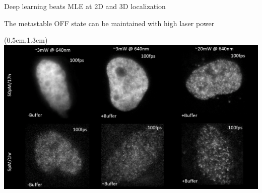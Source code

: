 \documentclass{beamer}					%
\begin{document}
\begin{frame}{Deep learning beats MLE at 2D and 3D localization}
\end{frame}


\begin{frame}{The metastable OFF state can be maintained with high laser power}
\begin{textblock*}{14cm}(0.5cm,1.3cm)
\includegraphics[width=14cm]{Laser.png}
\end{textblock*}
\end{frame}
\end{document}
